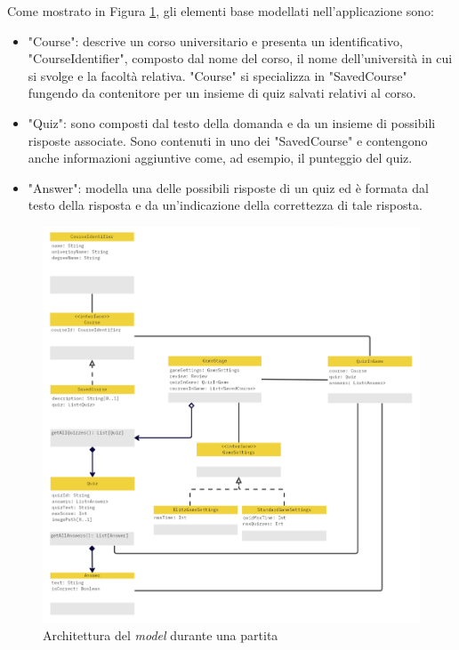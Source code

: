         Come mostrato in Figura \ref{fig:model-game}, gli elementi base modellati nell'applicazione sono:
        \begin{itemize}
            \item "Course": descrive un corso universitario e presenta un identificativo, "CourseIdentifier", composto dal nome del corso, il nome dell'università in cui si svolge e la facoltà relativa. "Course" si specializza in "SavedCourse" fungendo da contenitore per un insieme di quiz salvati relativi al corso. 
            \item "Quiz": sono composti dal testo della domanda e da un insieme di possibili risposte associate. Sono contenuti in uno dei "SavedCourse" e contengono anche informazioni aggiuntive come, ad esempio, il punteggio del quiz.
            \item "Answer": modella una delle possibili risposte di un quiz ed è formata dal testo della risposta e da un'indicazione della correttezza di tale risposta.
        \end{itemize}
        
        \begin{figure}[H]
            \centering
            \includegraphics[scale=0.6]{Miro/game_model.png}
            \caption{Architettura del \textit{model} durante una partita}
            \label{fig:model-game}
        \end{figure}

